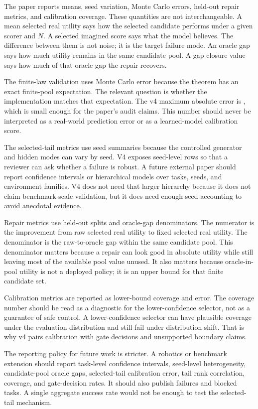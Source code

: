\documentclass{article}
\begin{document}
The paper reports means, seed variation, Monte Carlo errors, held-out repair
metrics, and calibration coverage. These quantities are not interchangeable.
A mean selected real utility says how the selected candidate performs under a
given scorer and $N$. A selected imagined score says what the model believes.
The difference between them is not noise; it is the target failure mode. An
oracle gap says how much utility remains in the same candidate pool. A gap
closure value says how much of that oracle gap the repair recovers.

The finite-law validation uses Monte Carlo error because the theorem has an
exact finite-pool expectation. The relevant question is whether the
implementation matches that expectation. The v4 maximum absolute error is
\VFourDWMExactLawMaxError{}, which is small enough for the paper's audit
claims. This number should never be interpreted as a real-world prediction
error or as a learned-model calibration score.

The selected-tail metrics use seed summaries because the controlled generator
and hidden modes can vary by seed. V4 exposes \VFourDWMSeedRows{} seed-level
rows so that a reviewer can ask whether a failure is robust. A future external
paper should report confidence intervals or hierarchical models over tasks,
seeds, and environment families. V4 does not need that larger hierarchy
because it does not claim benchmark-scale validation, but it does need enough
seed accounting to avoid anecdotal evidence.

Repair metrics use held-out splits and oracle-gap denominators. The numerator
is the improvement from raw selected real utility to fixed selected real
utility. The denominator is the raw-to-oracle gap within the same candidate
pool. This denominator matters because a repair can look good in absolute
utility while still leaving most of the available pool value unused. It also
matters because oracle-in-pool utility is not a deployed policy; it is an
upper bound for that finite candidate set.

Calibration metrics are reported as lower-bound coverage and error. The
coverage number should be read as a diagnostic for the lower-confidence
selector, not as a guarantee of safe control. A lower-confidence selector can
have plausible coverage under the evaluation distribution and still fail under
distribution shift. That is why v4 pairs calibration with gate decisions and
unsupported boundary claims.

The reporting policy for future work is stricter. A robotics or benchmark
extension should report task-level confidence intervals, seed-level
heterogeneity, candidate-pool oracle gaps, selected-tail calibration error,
tail rank correlation, coverage, and gate-decision rates. It should also
publish failures and blocked tasks. A single aggregate success rate would not
be enough to test the selected-tail mechanism.
\end{document}
